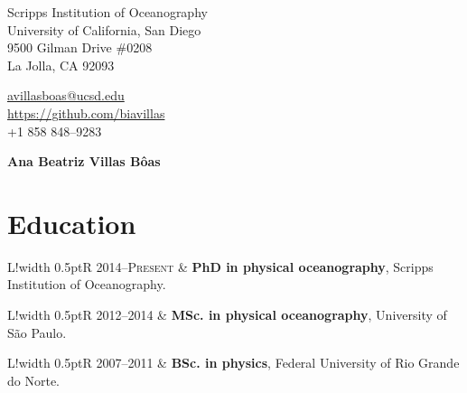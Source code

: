 \documentclass[10pt]{article}
\newcommand\VRule{\color{lightgray}\vrule width 0.5pt}
\begin{document}
\pagestyle{empty}
\begin{minipage}[ht]{0.48\textwidth}
\begin{flushleft}
\small{Scripps Institution of Oceanography} \\
\small{University of California, San Diego}\\
\small{9500 Gilman Drive \#0208} \\
\small{La Jolla, CA 92093} \\
\end{flushleft}
\end{minipage}
\hfill
\begin{minipage}[ht]{0.48\textwidth}
\begin{flushright}
\noindent \href{mailto:avillasboas@ucsd.edu}{avillasboas@ucsd.edu} \ \ \ \ \ \ \ \ \ \ \ \ \ \ \ \ \    \\
{\url{https://github.com/biavillas} }\\
\small{+1 858 848--9283} \ \ \ \ \ \ \ \ \ \ \ \ \ \ \ \ \  \ \ \ \ \ \ \ \ \ \   \\
\end{flushright}
\end{minipage}


\vspace{.5cm}
\begin{center}
	{\bfseries\Huge Ana Beatriz Villas B\^{o}as}
\end{center}
\vspace{.5cm}

\section*{Education}
\vspace{.3cm}
\begin{tabular}{L!{\VRule}R}
\textsc{2014--Present} & \textbf{PhD in physical oceanography}, Scripps Institution of Oceanography. \\ 
\end{tabular}
\newline \noindent
\newline \noindent
\begin{tabular}{L!{\VRule}R}
\textsc{2012--2014} & \textbf{MSc. in physical oceanography}, University of São Paulo. \\ 
\end{tabular}
\newline \noindent
\newline \noindent
\begin{tabular}{L!{\VRule}R}
\textsc{2007--2011} & \textbf{BSc. in physics}, Federal University of Rio Grande do Norte. \\
\end{tabular}
\end{document}
